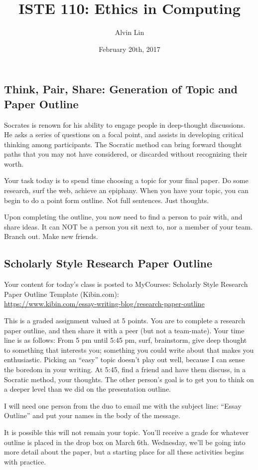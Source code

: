 \documentclass{article}
\title{ISTE 110: Ethics in Computing}
\author{Alvin Lin}
\date{February 20th, 2017}
\begin{document}
\maketitle

\subsection*{Think, Pair, Share: Generation of Topic and Paper Outline}
Socrates is renown for his ability to engage people in deep-thought
discussions. He asks a series of questions on a focal point, and assists in
developing critical thinking among participants. The Socratic method can bring
forward thought paths that you may not have considered, or discarded without
recognizing their worth. \par
Your task today is to spend time choosing a topic for your final paper. Do some
research, surf the web, achieve an epiphany. When you have your topic, you can
begin to do a point form outline. Not full sentences. Just thoughts. \par
Upon completing the outline, you now need to find a person to pair with, and
share ideas. It can NOT be a person you sit next to, nor a member of your
team. Branch out. Make new friends. \par

\subsection*{Scholarly Style Research Paper Outline}
Your content for today's class is posted to MyCourses:
Scholarly Style Research Paper Outline Template (Kibin.com): \\
\url{https://www.kibin.com/essay-writing-blog/research-paper-outline} \par
This is a graded assignment valued at 5 points. You are to complete a research
paper outline, and then share it with a peer (but not a team-mate).
Your time line is as follows: From 5 pm until 5:45 pm, surf, brainstorm, give
deep thought to something that interests you; something you could write about
that makes you enthusiastic. Picking an ``easy'' topic doesn't play out well,
because I can sense the boredom in your writing. At 5:45, find a friend and
have them discuss, in a Socratic method, your thoughts. The other person's goal
is to get you to think on a deeper level than we did on the presentation
outline. \par
I will need one person from the duo to email me with the subject line: ``Essay
Outline'' and put your names in the body of the message. \par
It is possible this will not remain your topic. You'll receive a grade for
whatever outline is placed in the drop box on March 6th. Wednesday, we'll be
going into more detail about the paper, but a starting place for all these
activities begins with practice.
\end{document}
